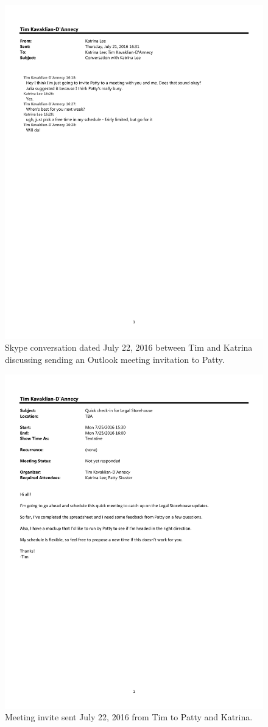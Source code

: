\begin{figure}
  \centering
  \noindent\includegraphics[page=1,angle=-90,origin=c,width=.75\textwidth,height=.75\textheight]{documents/2016-07-21-Conversation-Katrina}
 \caption{Skype conversation dated July 22, 2016 between Tim and Katrina discussing sending an Outlook meeting invitation to Patty.}
 \label{fig:2016-07-21-Conversation-Katrina}
\end{figure}

\begin{figure}
  \centering
  \noindent\includegraphics[page=1,angle=-90,origin=c,width=.75\textwidth,height=.75\textheight]{documents/2016-07-21-Meeting-invite}
 \caption{Meeting invite sent July 22, 2016 from Tim to Patty and Katrina.}
 \label{fig:2016-07-21-Meeting-invite}
\end{figure}

